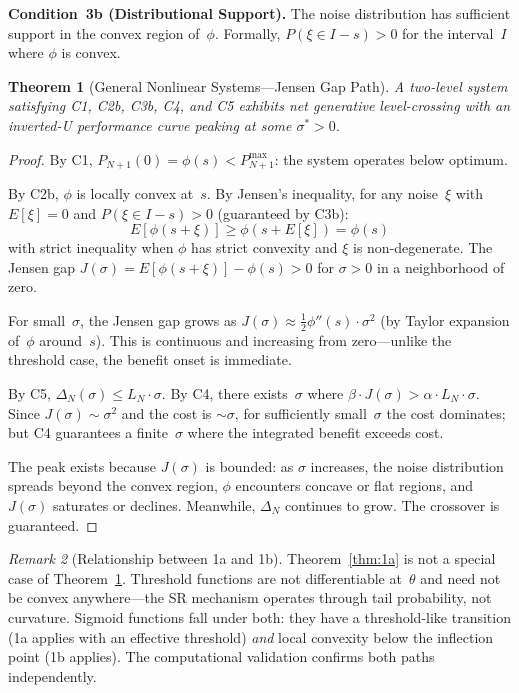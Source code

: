 \documentclass[12pt,letterpaper]{article}
\newtheorem{theorem}{Theorem}[section]
\theoremstyle{definition}
\theoremstyle{remark}
\newtheorem{remark}[theorem]{Remark}
\newcommand{\Pnp}{P_{N+1}}
\begin{document}
\medskip
\noindent\textbf{Condition~3b (Distributional Support).} The noise distribution has sufficient support in the convex region of~$\phi$. Formally, $P(\xi \in I - s) > 0$ for the interval~$I$ where $\phi$ is convex.

\begin{theorem}[General Nonlinear Systems---Jensen Gap Path]
\label{thm:1b}
A two-level system satisfying C1, C2b, C3b, C4, and C5 exhibits net generative level-crossing with an inverted-U performance curve peaking at some $\sigma^* > 0$.
\end{theorem}

\begin{proof}
By C1, $\Pnp(0) = \phi(s) < P_{N+1}^{\max}$: the system operates below optimum.

By C2b, $\phi$ is locally convex at~$s$. By Jensen's inequality, for any noise~$\xi$ with $E[\xi] = 0$ and $P(\xi \in I - s) > 0$ (guaranteed by C3b):
\begin{equation}
E[\phi(s + \xi)] \geq \phi(s + E[\xi]) = \phi(s)
\end{equation}
with strict inequality when $\phi$ has strict convexity and $\xi$ is non-degenerate. The Jensen gap $J(\sigma) = E[\phi(s + \xi)] - \phi(s) > 0$ for $\sigma > 0$ in a neighborhood of zero.

For small~$\sigma$, the Jensen gap grows as $J(\sigma) \approx \frac{1}{2}\phi''(s) \cdot \sigma^2$ (by Taylor expansion of~$\phi$ around~$s$). This is continuous and increasing from zero---unlike the threshold case, the benefit onset is immediate.

By C5, $\Delta_N(\sigma) \leq L_N \cdot \sigma$. By C4, there exists~$\sigma$ where $\beta \cdot J(\sigma) > \alpha \cdot L_N \cdot \sigma$. Since $J(\sigma) \sim \sigma^2$ and the cost is $\sim \sigma$, for sufficiently small~$\sigma$ the cost dominates; but C4 guarantees a finite~$\sigma$ where the integrated benefit exceeds cost.

The peak exists because $J(\sigma)$ is bounded: as $\sigma$ increases, the noise distribution spreads beyond the convex region, $\phi$ encounters concave or flat regions, and $J(\sigma)$ saturates or declines. Meanwhile, $\Delta_N$ continues to grow. The crossover is guaranteed.
\end{proof}

\begin{remark}[Relationship between 1a and 1b]
Theorem~\ref{thm:1a} is not a special case of Theorem~\ref{thm:1b}. Threshold functions are not differentiable at~$\theta$ and need not be convex anywhere---the SR mechanism operates through tail probability, not curvature. Sigmoid functions fall under both: they have a threshold-like transition (1a applies with an effective threshold) \emph{and} local convexity below the inflection point (1b applies). The computational validation confirms both paths independently.
\end{remark}
\end{document}
